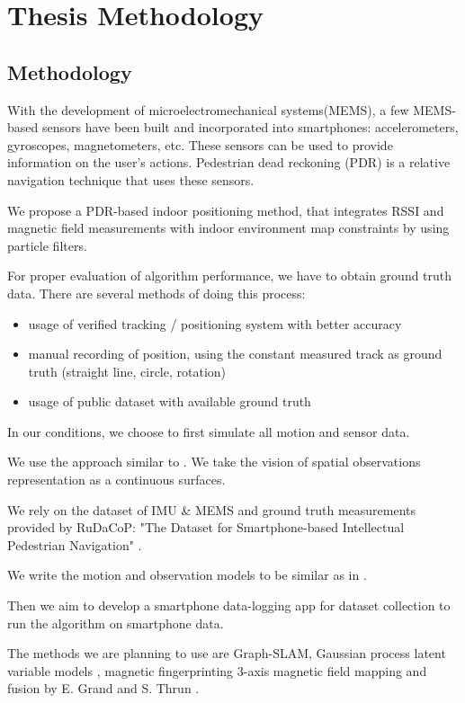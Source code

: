 \chapter{Thesis Methodology}
\label{cap:thesis_methodology}

\section{Methodology}

With the development of microelectromechanical systems(MEMS), a few MEMS-based sensors have been built and incorporated into smartphones: accelerometers, gyroscopes, magnetometers, etc. These sensors can be used to provide information on the user’s actions. Pedestrian dead reckoning (PDR) is a relative navigation technique that uses these sensors.

We propose a PDR-based indoor positioning method, that integrates RSSI and magnetic field measurements with indoor environment map constraints by using particle filters.

For proper evaluation of algorithm performance, we have to obtain ground truth data.
There are several methods of doing this process:

\begin{itemize}
\item  usage of verified tracking / positioning system with better accuracy
\item  manual recording of position, using the constant measured track as ground truth (straight line, circle, rotation)
\item  usage of public dataset with available ground truth
\end{itemize}

In our conditions, we choose to first simulate all motion and sensor data.

We use the approach similar to \cite{LocateMe}. We take the vision of spatial observations representation as a continuous surfaces.

We rely on the dataset of IMU \& MEMS and ground truth measurements provided by RuDaCoP: "The Dataset for Smartphone-based Intellectual Pedestrian Navigation" \cite{rudacop}.

We write the motion and observation models to be similar as in  \cite{LocateMe}.

Then we aim to develop a smartphone data-logging app for dataset collection to run the algorithm on smartphone data.

The methods we are planning to use are Graph-SLAM, Gaussian process latent variable models \cite{gplvm}, magnetic  fingerprinting 3-axis magnetic field mapping and fusion by E. Grand and S. Thrun \cite{Grand20123AxisMF}.

